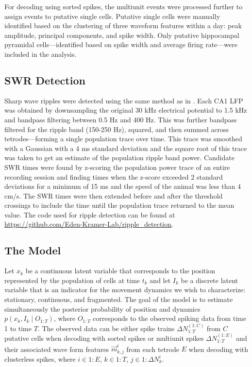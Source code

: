 \documentclass[times, twoside]{zHenriquesLab-StyleBioRxiv}
\begin{document}
For decoding using sorted spikes, the multiunit events were processed further to assign events to putative single cells. Putative single cells were manually identified based on the clustering of three waveform features within a day: peak amplitude, principal components, and spike width. Only putative hippocampal pyramidal cells---identified based on spike width and average firing rate---were included in the analysis.

\subsection*{SWR Detection}
Sharp wave ripples were detected using the same method as in \cite{Kayhippocampalnetworkspatial2016}. Each CA1 LFP was obtained by downsampling the original 30 kHz electrical potential to 1.5 kHz and bandpass filtering between 0.5 Hz and 400 Hz. This was further bandpass filtered for the ripple band (150-250 Hz), squared, and then summed across tetrodes---forming a single population trace over time. This trace was smoothed with a Gaussian with a 4 ms standard deviation and the square root of this trace was taken to get an estimate of the population ripple band power. Candidate SWR times were found by z-scoring the population power trace of an entire recording session and finding times when the z-score exceeded 2 standard deviations for a minimum of 15 ms and the speed of the animal was less than 4 cm/s. The SWR times were then extended before and after the threshold crossings to include the time until the population trace returned to the mean value. The code used for ripple detection can be found at \url{https://github.com/Eden-Kramer-Lab/ripple_detection}.

\subsection*{The Model}
Let $x_{k}$ be a continuous latent variable that corresponds to the position represented by the population of cells at time $t_k$ and let $I_{k}$ be a discrete latent variable that is an indicator for the movement dynamics we wish to characterize: stationary, continuous, and fragmented. The goal of the model is to estimate simultaneously the posterior probability of position and dynamics $p(x_k, I_k \mid O_{1:T})$, where $O_{1:T}$ corresponds to the observed spiking data from time 1 to time $T$. The observed data can be either spike trains $\Delta N_{1:T}^{(1:C)}$ from $C$ putative cells when decoding with sorted spikes or multiunit spikes $\Delta N_{1:T}^{(1:E)}$ and their associated wave form features $\Vec{m}^i_{k,j}$ from each tetrode $E$ when decoding with clusterless spikes, where $i \in 1:E$, $k \in 1:T$, $j \in 1:\Delta N_k^i$.
\end{document}
